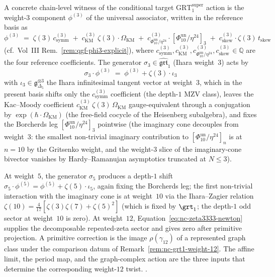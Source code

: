 \begin{remark}
\label{rem:nc-grt1-phi3-verification}
A concrete chain-level witness of the conditional target
$\mathrm{GRT}_1^{\mathrm{super}}$ action is the weight-$3$ component
$\phi^{(3)}$ of the
universal associator, written in the reference basis as
\[
\phi^{(3)}
\;=\;
\zeta(3)\,c_{\mathrm{symm}}^{(3)}
\;+\; c_{\mathrm{KM}}^{(3)}\,\zeta(3)\cdot\Omega_{\mathrm{KM}}
\;+\; c_{\Phi_{10}^{\mathrm{un}}/\eta^{24}}^{(3)}\cdot[\Phi_{10}^{\mathrm{un}}/\eta^{24}]_3
\;+\; c_{\mathrm{skew}}^{(3)}\cdot\zeta(3)\,t_{\mathrm{skew}}
\]
(cf.~Vol~III Rem.~\ref{rem:qgf-phi3-explicit}), where
$c_{\mathrm{symm}}^{(3)}, c_{\mathrm{KM}}^{(3)},
c_{\Phi_{10}^{\mathrm{un}}/\eta^{24}}^{(3)}, c_{\mathrm{skew}}^{(3)} \in \mathbb Q$
are the four reference coefficients. The generator
$\sigma_3 \in \widehat{\mathfrak{grt}}_1$ (Ihara weight~$3$) acts by
\[
\sigma_3\cdot\phi^{(3)}
\;=\;
\phi^{(3)} + \zeta(3)\cdot\iota_3
\]
with $\iota_3 \in \mathfrak g_{\Delta_5}^{\otimes 3}$ the Ihara
infinitesimal tangent vector at weight~$3$, which in the present
basis shifts only the $c_{\mathrm{symm}}^{(3)}$ coefficient (the
depth-$1$ MZV class), leaves the Kac--Moody coefficient
$c_{\mathrm{KM}}^{(3)}\,\zeta(3)\,\Omega_{\mathrm{KM}}$ gauge-equivalent
through a conjugation by $\exp(\hbar\cdot\Omega_{\mathrm{KM}})$
(the free-field cocycle of the Heisenberg subalgebra), and fixes
the Borcherds leg $[\Phi_{10}^{\mathrm{un}}/\eta^{24}]_3$ pointwise (the imaginary
cone decouples from weight~$3$: the smallest non-trivial imaginary
contribution to $[\Phi_{10}^{\mathrm{un}}/\eta^{24}]_n$ is at $n = 10$ by the
Gritsenko weight, and the weight-$3$ slice of the imaginary-cone
bivector vanishes by Hardy--Ramanujan asymptotics truncated at
$N \le 3$).

At weight~$5$, the generator $\sigma_5$ produces a depth-$1$ shift
$\sigma_5\cdot\phi^{(5)} = \phi^{(5)} + \zeta(5)\cdot\iota_5$, again
fixing the Borcherds leg; the first non-trivial interaction with
the imaginary cone is at weight~$10$ via the Ihara--Zagier relation
$\zeta(10) = \frac{4}{17}[\zeta(3)\zeta(7) + \zeta(5)^2]$
(which is fixed by $\grt_1$; the depth-$1$ odd sector at weight~$10$
is zero).  At
weight~$12$, Equation~\eqref{eq:nc-zeta3333-newton} supplies the
decomposable repeated-zeta sector and gives zero after primitive
projection.  A primitive correction is the image
$\rho(\gamma_{12})$ of a represented graph class under the
comparison datum of Remark~\ref{rem:nc-grt1-weight-12}.  The affine
limit, the period map, and the graph-complex action are the three
inputs that determine the corresponding weight-$12$ twist.
\cite{Drinfeld1990,Brown2012,EtingofKazhdan2000,GritsenkoNikulin1998}.
\end{remark}

